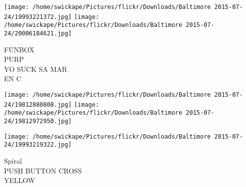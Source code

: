 \documentclass[10pt,letterpaper]{article}
\begin{document}
\texttt{[image: /home/swickape/Pictures/flickr/Downloads/Baltimore 2015-07-24/19993221372.jpg]}
\texttt{[image: /home/swickape/Pictures/flickr/Downloads/Baltimore 2015-07-24/20006184621.jpg]}

FUNBOX\\
PURP\\
YO SUCK SA MAR\\
EN C
\pagebreak

\texttt{[image: /home/swickape/Pictures/flickr/Downloads/Baltimore 2015-07-24/19812880808.jpg]}
\texttt{[image: /home/swickape/Pictures/flickr/Downloads/Baltimore 2015-07-24/19812972950.jpg]}

\vspace{0.25in}
\texttt{[image: /home/swickape/Pictures/flickr/Downloads/Baltimore 2015-07-24/19993219322.jpg]}

Spiral\\
PUSH BUTTON CROSS\\
YELLOW
\pagebreak
\end{document}

